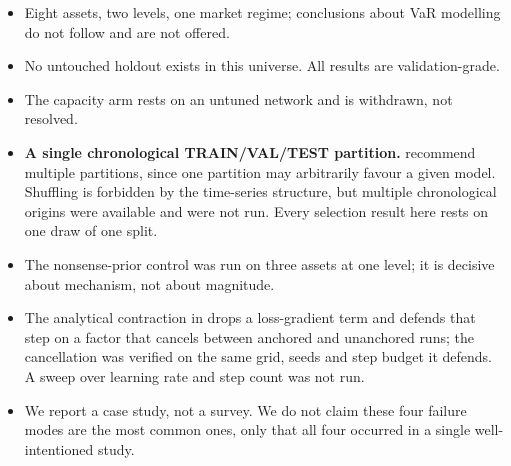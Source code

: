 \begin{itemize}
\tightlist
\item
  Eight assets, two levels, one market regime; conclusions about VaR modelling do not follow
  and are not offered.
\item
  No untouched holdout exists in this universe. All results are validation-grade.
\item
  The capacity arm rests on an untuned network and is withdrawn, not resolved.
\item
  \textbf{A single chronological TRAIN/VAL/TEST partition.} \citet{cawley2010over} recommend multiple
  partitions, since one partition may arbitrarily favour a given model. Shuffling is forbidden
  by the time-series structure, but multiple chronological origins were available and were not
  run. Every selection result here rests on one draw of one split.
\item
  The nonsense-prior control was run on three assets at one level; it is decisive about
  mechanism, not about magnitude.
\item
  The analytical contraction in  drops a loss-gradient term and defends that step on a
  factor that cancels between anchored and unanchored runs; the cancellation was verified on
  the same grid, seeds and step budget it defends. A sweep over learning rate and step count
  was not run.
\item
  We report a case study, not a survey. We do not claim these four failure modes are the most
  common ones, only that all four occurred in a single well-intentioned study.
\end{itemize}

